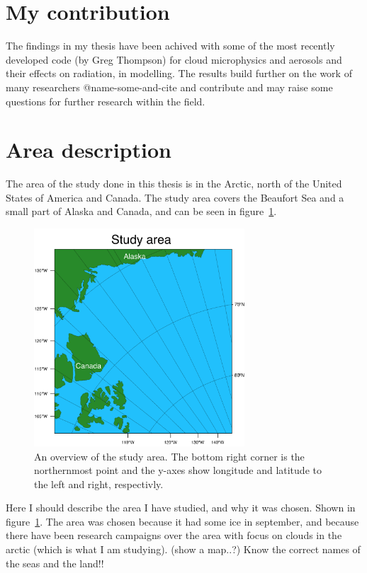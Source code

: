 \section{My contribution}
The findings in my thesis have been achived with some of the most recently developed code (by Greg Thompson) for cloud microphysics and aerosols and their effects on radiation, in modelling. The results build further on the work of many researchers @name-some-and-cite and contribute and may raise some questions for further research within the field.

\section{Area description}
The area of the study done in this thesis is in the Arctic, north of the United States of America and Canada. The study area covers the Beaufort Sea and a small part of Alaska and Canada, and can be seen in figure~\ref{fig:area}.

\begin{figure}
\centering
\includegraphics[width=0.7\textwidth]{introduction/studyarea.png}
\caption{An overview of the study area. The bottom right corner is the northernmost point and the y-axes show longitude and latitude to the left and right, respectivly.}
\label{fig:area}
\end{figure}
 

Here I should describe the area I have studied, and why it was chosen. Shown in figure~\ref{fig:area}.
The area was chosen because it had some ice in september, and because there have been research campaigns over the area with focus on clouds in the arctic (which is what I am studying). (show a map..?) Know the correct names of the seas and the land!!


